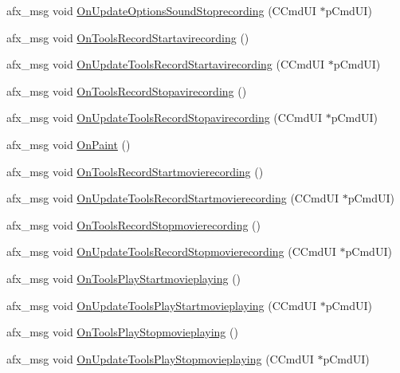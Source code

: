 \begin{DoxyCompactItemize}
\item 
afx\+\_\+msg void \mbox{\hyperlink{class_main_wnd_af54c122c1f7c4787b8441f35384da473}{On\+Update\+Options\+Sound\+Stoprecording}} (C\+Cmd\+UI $\ast$p\+Cmd\+UI)
\item 
afx\+\_\+msg void \mbox{\hyperlink{class_main_wnd_ae512a86963451914ea7eee95c85d6280}{On\+Tools\+Record\+Startavirecording}} ()
\item 
afx\+\_\+msg void \mbox{\hyperlink{class_main_wnd_a56e8845d8092224b874101a2deb947b9}{On\+Update\+Tools\+Record\+Startavirecording}} (C\+Cmd\+UI $\ast$p\+Cmd\+UI)
\item 
afx\+\_\+msg void \mbox{\hyperlink{class_main_wnd_a46eb975ae0f428195025c8c2a83fcabb}{On\+Tools\+Record\+Stopavirecording}} ()
\item 
afx\+\_\+msg void \mbox{\hyperlink{class_main_wnd_a3265cdcc2e36ee6c34137fc470b6b7e0}{On\+Update\+Tools\+Record\+Stopavirecording}} (C\+Cmd\+UI $\ast$p\+Cmd\+UI)
\item 
afx\+\_\+msg void \mbox{\hyperlink{class_main_wnd_a0c100c54d2e6d48fa3f68d2da1609e65}{On\+Paint}} ()
\item 
afx\+\_\+msg void \mbox{\hyperlink{class_main_wnd_af473a4d7ccfadb980b92de352ea6a4ae}{On\+Tools\+Record\+Startmovierecording}} ()
\item 
afx\+\_\+msg void \mbox{\hyperlink{class_main_wnd_acd6ea3612f6959388549defbb7398b16}{On\+Update\+Tools\+Record\+Startmovierecording}} (C\+Cmd\+UI $\ast$p\+Cmd\+UI)
\item 
afx\+\_\+msg void \mbox{\hyperlink{class_main_wnd_a5bd28d030d2596417ba4479fe7a5dfad}{On\+Tools\+Record\+Stopmovierecording}} ()
\item 
afx\+\_\+msg void \mbox{\hyperlink{class_main_wnd_aa72a602faefe912310c776e32445c708}{On\+Update\+Tools\+Record\+Stopmovierecording}} (C\+Cmd\+UI $\ast$p\+Cmd\+UI)
\item 
afx\+\_\+msg void \mbox{\hyperlink{class_main_wnd_a96ea89975374d5b7a434070d58e9c260}{On\+Tools\+Play\+Startmovieplaying}} ()
\item 
afx\+\_\+msg void \mbox{\hyperlink{class_main_wnd_aca67af593b1041fbdab04ddfd2bf5910}{On\+Update\+Tools\+Play\+Startmovieplaying}} (C\+Cmd\+UI $\ast$p\+Cmd\+UI)
\item 
afx\+\_\+msg void \mbox{\hyperlink{class_main_wnd_a82b88a60ca164731e9ccec3055e763c9}{On\+Tools\+Play\+Stopmovieplaying}} ()
\item 
afx\+\_\+msg void \mbox{\hyperlink{class_main_wnd_ab8effcda4b05e28ae51729df11115cae}{On\+Update\+Tools\+Play\+Stopmovieplaying}} (C\+Cmd\+UI $\ast$p\+Cmd\+UI)

\end{DoxyCompactItemize}
